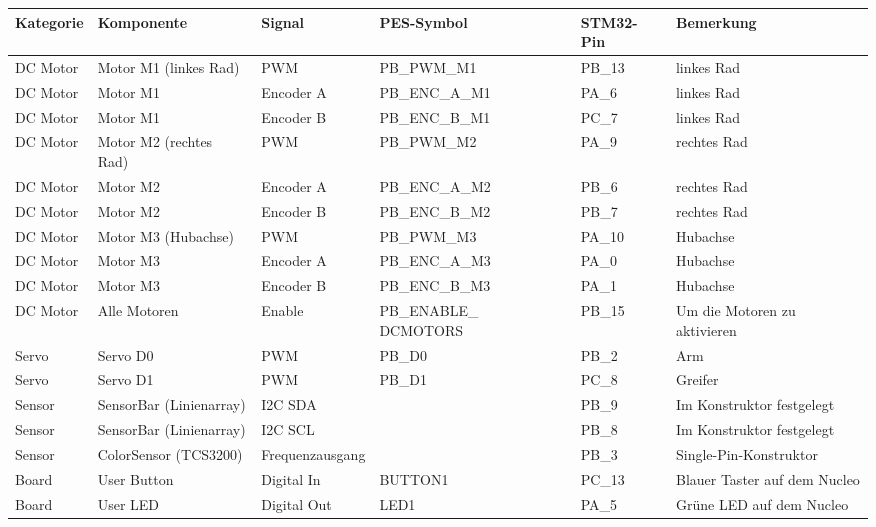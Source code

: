 \documentclass[11pt,a4paper]{article}
\begin{document}
	\begin{table}[H]
		\centering
		\scriptsize
		\label{tab:pinbelegung_pes_board}
		\begin{tabularx}{\textwidth}{|p{2.1cm}|p{3.1cm}|p{2.2cm}|X|p{1.5cm}|X|}
			\hline
			\textbf{Kategorie} & \textbf{Komponente} & \textbf{Signal} & \textbf{PES-Symbol} & \textbf{STM32-Pin} & \textbf{Bemerkung} \\
			\hline
			
			DC Motor & Motor M1 (linkes Rad) & PWM & PB\_PWM\_M1 & PB\_13 & linkes Rad\\
			\hline
			DC Motor & Motor M1 & Encoder A & PB\_ENC\_A\_M1 & PA\_6 & linkes Rad \\
			\hline
			DC Motor & Motor M1 & Encoder B & PB\_ENC\_B\_M1 & PC\_7 & linkes Rad \\
			\hline
			DC Motor & Motor M2 (rechtes Rad) & PWM & PB\_PWM\_M2 & PA\_9 & rechtes Rad \\
			\hline
			DC Motor & Motor M2 & Encoder A & PB\_ENC\_A\_M2 & PB\_6 & rechtes Rad \\
			\hline
			DC Motor & Motor M2 & Encoder B & PB\_ENC\_B\_M2 & PB\_7 & rechtes Rad \\
			\hline
			DC Motor & Motor M3 (Hubachse) & PWM & PB\_PWM\_M3 & PA\_10 &  Hubachse\\
			\hline
			DC Motor & Motor M3 & Encoder A & PB\_ENC\_A\_M3 & PA\_0 & Hubachse \\
			\hline
			DC Motor & Motor M3 & Encoder B & PB\_ENC\_B\_M3 & PA\_1 & Hubachse \\
			\hline
			DC Motor & Alle Motoren & Enable & PB\_ENABLE\_ DCMOTORS & PB\_15 & Um die Motoren zu aktivieren \\
			\hline
			
			Servo & Servo D0 & PWM & PB\_D0 & PB\_2 & Arm \\
			\hline
			Servo & Servo D1 & PWM & PB\_D1 & PC\_8 & Greifer\\
			\hline
			
			Sensor & SensorBar (Linienarray) & I2C SDA &  & PB\_9 & Im Konstruktor festgelegt \\
			\hline
			Sensor & SensorBar (Linienarray) & I2C SCL &  & PB\_8 & Im Konstruktor festgelegt \\
			\hline
			Sensor & ColorSensor (TCS3200) & Frequenzausgang &  & PB\_3 & Single-Pin-Konstruktor \\
			\hline
			
			Board & User Button & Digital In & BUTTON1 & PC\_13 & Blauer Taster auf dem Nucleo \\
			\hline
			Board & User LED & Digital Out & LED1 & PA\_5 & Grüne LED auf dem Nucleo \\
			\hline
			
			
		\end{tabularx}
	\end{table}
	
\end{document}
